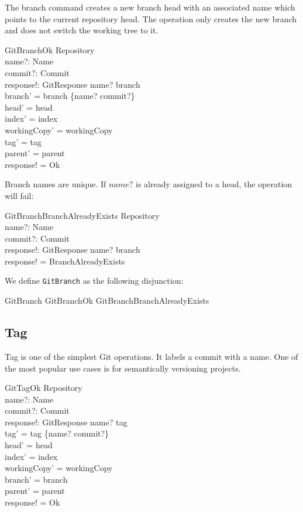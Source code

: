 The branch command creates a new branch head with an associated name
which points to the current repository head. The operation only creates the new
branch and does not switch the working tree to it.

\begin{schema}{GitBranchOk}
	\Delta Repository \\
	name?: Name \\
	commit?: Commit \\
	response!: GitResponse
\where
	name? \notin \dom branch \\
	branch' = branch \cup \{name? \mapsto commit?\} \\
	head' = head \\
	index' = index \\
	workingCopy' = workingCopy \\
	tag' = tag \\
	parent' = parent \\
	response! = Ok
\end{schema}

Branch names are unique. If $name?$ is already assigned to a head, the operation
will fail:

\begin{schema}{GitBranchBranchAlreadyExists}
	\Xi Repository \\
	name?: Name \\
	commit?: Commit \\
	response!: GitResponse
\where
	name? \in \dom branch \\
  response! = BranchAlreadyExists
\end{schema}

We define \texttt{GitBranch} as the following disjunction:

\begin{zed}
	GitBranch  GitBranchOk \lor GitBranchBranchAlreadyExists
\end{zed}

\subsection{Tag}

Tag is one of the simplest Git operations. It labels a commit
with a name. One of the most popular use cases is for semantically
versioning projects.

\begin{schema}{GitTagOk}
	\Delta Repository \\
	name?: Name \\
	commit?: Commit \\
	response!: GitResponse
\where
	name? \notin \dom tag \\
	tag' = tag \cup \{name? \mapsto commit?\} \\
	head' = head \\
	index' = index \\
	workingCopy' = workingCopy \\
	branch' = branch \\
	parent' = parent \\
	response! = Ok
\end{schema}

